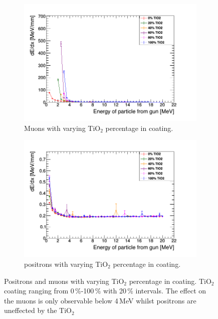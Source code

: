\documentclass[12pt,a4paper]{article}
\begin{document}
\begin{figure}[H]
\centering
\begin{subfigure}{.5\textwidth}
  \centering
  \includegraphics[width=\linewidth]{muon_TiO2__.png}
  \captionsetup{width=.9\linewidth}
  \caption{Muons with varying TiO$_2$ percentage in coating.}
  \label{muon_tio2_per}
\end{subfigure}%
\begin{subfigure}{.5\textwidth}
  \centering
  \includegraphics[width=\linewidth]{positron_TiO2__.png}
  \captionsetup{width=.9\linewidth}
  \caption{positrons with varying TiO$_2$ percentage in coating.}
  \label{pos_tio2_per}
\end{subfigure}
\caption{Positrons and muons with varying TiO$_2$ percentage in coating. TiO$_2$ coating ranging from 0\,\%-100\,\% with 20\,\% intervals. The effect on the muons is only observable below 4\,MeV whilst positrons are uneffected by the TiO$_2$}
\label{muon_pos_tio2_per}
\end{figure}
\end{document}
